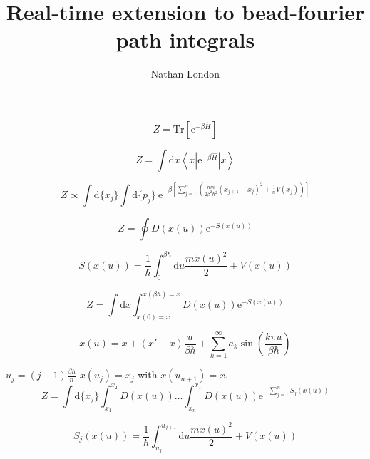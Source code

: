 \documentclass[11 pt]{article}
\title{Real-time extension to bead-fourier path integrals}
\author{Nathan London}
\date{}							%
\begin{document}
\maketitle

\tableofcontents
\newpage

  \begin{equation}
    \label{eq:label}
    Z = \mathrm{Tr} \left[ \mathrm{e}^{-\beta \hat{H}} \right]
  \end{equation}
 
  \begin{equation}
    Z = \int \mathrm{d}x \left\langle x \left| \mathrm{e}^{-\beta \hat{H}} \right| x \right\rangle
  \end{equation}
  
  \begin{equation}	
    Z \propto \int \mathrm{d}\{x_j\} \int \mathrm{d}\{p_j\}\ \mathrm{e}^{-\beta\left[ \sum^{n}_{j=1}\left( \frac{nm}{2\beta^2\hbar^2}
    (x_{j+1}-x_j)^2 + \frac{1}{n}V(x_j)\right)\right]}
  \end{equation}
 
  \begin{equation}
    Z = \oint D(x(u))\mathrm{e}^{-S(x(u))}
  \end{equation}
 
  \begin{equation}
    S(x(u)) = \frac{1}{\hbar}\int_{{0}}^{{\beta\hbar}}\mathrm{d}{u} { \frac{m\dot{x}(u)^2}{2}+ V(x(u))}
  \end{equation}
 
  \begin{equation}
    Z = \int \mathrm{d}x \int_{x(0)=x}^{x(\beta\hbar)=x} D(x(u))\mathrm{e}^{-S(x(u))}
  \end{equation}
  

  \begin{equation}
    x(u) = x + (x' -x) \frac{u}{\beta\hbar} + \sum^{\infty}_{k=1} a_k \sin\left( \frac{k\pi u}{\beta\hbar}\right)
  \end{equation}
 
  $u_j = (j-1) \frac{\beta\hbar}{n}$
  $x(u_j) = x_j$ with $x(u_{n+1}) = x_1$
  \begin{equation}
    Z = \int \mathrm{d}\{x_j\}\int_{x_1}^{x_2} D(x(u))\dots\int_{x_n}^{x_1} D(x(u))
    \mathrm{e}^{ -\sum_{j=1}^n S_j(x(u))} 
  \end{equation}
 
  \begin{equation}
    S_j(x(u)) = \frac{1}{\hbar}\int_{u_j}^{u_{j+1}}\mathrm{d}{u}  \frac{m\dot{x}(u)^2}{2}+ V(x(u))
  \end{equation}
 
\end{document}
